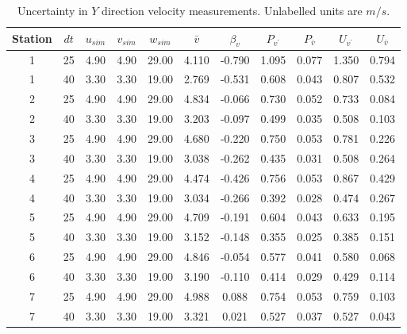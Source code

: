 \begin{table}[H]
\begin{center}
\begin{tabular}{|ccccccccccc|}
	\hline
	Station & $dt$ & $u_{sim}$ & $v_{sim}$ & $w_{sim}$ & $\bar{v}$ & $\beta_v$ & $P_{v^{\prime}}$ & $P_{\bar{v}}$ & $U_{v^{\prime}}$ & $U_{\bar{v}}$\\
	\hline
	1 & 25 & 4.90 & 4.90 & 29.00 & 4.110 & -0.790 & 1.095 & 0.077 & 1.350 & 0.794\\
	1 & 40 & 3.30 & 3.30 & 19.00 & 2.769 & -0.531 & 0.608 & 0.043 & 0.807 & 0.532\\
	2 & 25 & 4.90 & 4.90 & 29.00 & 4.834 & -0.066 & 0.730 & 0.052 & 0.733 & 0.084\\
	2 & 40 & 3.30 & 3.30 & 19.00 & 3.203 & -0.097 & 0.499 & 0.035 & 0.508 & 0.103\\
	3 & 25 & 4.90 & 4.90 & 29.00 & 4.680 & -0.220 & 0.750 & 0.053 & 0.781 & 0.226\\
	3 & 40 & 3.30 & 3.30 & 19.00 & 3.038 & -0.262 & 0.435 & 0.031 & 0.508 & 0.264\\
	4 & 25 & 4.90 & 4.90 & 29.00 & 4.474 & -0.426 & 0.756 & 0.053 & 0.867 & 0.429\\
	4 & 40 & 3.30 & 3.30 & 19.00 & 3.034 & -0.266 & 0.392 & 0.028 & 0.474 & 0.267\\
	5 & 25 & 4.90 & 4.90 & 29.00 & 4.709 & -0.191 & 0.604 & 0.043 & 0.633 & 0.195\\
	5 & 40 & 3.30 & 3.30 & 19.00 & 3.152 & -0.148 & 0.355 & 0.025 & 0.385 & 0.151\\
	6 & 25 & 4.90 & 4.90 & 29.00 & 4.846 & -0.054 & 0.577 & 0.041 & 0.580 & 0.068\\
	6 & 40 & 3.30 & 3.30 & 19.00 & 3.190 & -0.110 & 0.414 & 0.029 & 0.429 & 0.114\\
	7 & 25 & 4.90 & 4.90 & 29.00 & 4.988 & 0.088 & 0.754 & 0.053 & 0.759 & 0.103\\
	7 & 40 & 3.30 & 3.30 & 19.00 & 3.321 & 0.021 & 0.527 & 0.037 & 0.527 & 0.043\\
	\hline
\end{tabular}
\caption{Uncertainty in $Y$ direction velocity measurements. Unlabelled units are $m/s$.}
\label{table:uncertainties_v}
\end{center}
\end{table}

